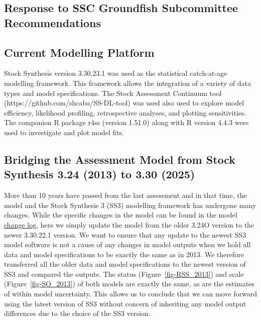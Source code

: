 \documentclass[
]{scrartcl}
\begin{document}
\subsection{Response to SSC Groundfish Subcommittee
Recommendations}\label{response-to-ssc-groundfish-subcommittee-recommendations}

\subsection{Current Modelling
Platform}\label{current-modelling-platform}

Stock Synthesis version 3.30.23.1 was used as the statistical
catch-at-age modelling framework. This framework allows the integration
of a variety of data types and model specifications. The Stock
Assessment Continuum tool (https://github.com/shcaba/SS-DL-tool) was
used also used to explore model efficiency, likelihood profiling,
retrospective analyses, and plotting sensitivities. The companion R
package r4ss (version 1.51.0) along with R version 4.4.3 were used to
investigate and plot model fits.

\subsection{Bridging the Assessment Model from Stock Synthesis 3.24
(2013) to 3.30
(2025)}\label{bridging-the-assessment-model-from-stock-synthesis-3.24-2013-to-3.30-2025}

More than 10 years have passed from the last assessment and in that
time, the model and the Stock Synthesis 3 (SS3) modelling framework has
undergone many changes. While the specific changes in the model can be
found in the model
\href{https://github.com/orgs/nmfs-ost/projects/11}{change log}, here we
simply update the model from the older 3.24O version to the newer
3.30.22.1 version. We want to ensure that any update to the newest SS3
model software is not a cause of any changes in model outputs when we
hold all data and model specifications to be exactly the same as in
2013. We therefore transferred all the older data and model
specifications to the newest version of SS3 and compared the outputs.
The status (Figure~\ref{fig-RSS_2013}) and scale
(Figure~\ref{fig-SO_2013}) of both models are exactly the same, as are
the estimates of within model uncertainty. This allows us to conclude
that we can move forward using the latest version of SS3 without concern
of inheriting any model output differences due to the choice of the SS3
version.
\end{document}
